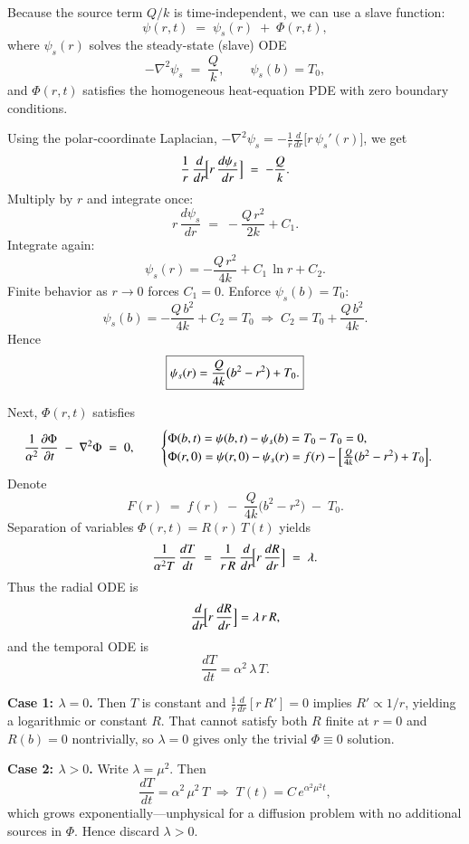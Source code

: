 \documentclass{report}
\begin{document}
Because the source term \(Q/k\) is time‐independent, we can use a slave function:
\[
\psi(r,t) \;=\; \psi_{s}(r) \;+\; \Phi(r,t),
\]
where \(\psi_{s}(r)\) solves the steady-state (slave) ODE
\[
-\nabla^{2}\psi_{s} \;=\; \frac{Q}{k}, 
\qquad \psi_{s}(b)=T_{0},
\]
and \(\Phi(r,t)\) satisfies the homogeneous heat‐equation PDE with zero boundary conditions.

Using the polar‐coordinate Laplacian, \(-\nabla^{2}\psi_{s} = -\frac{1}{r}\frac{d}{dr}\!\bigl[r\,\psi_{s}'(r)\bigr]\), we get
\[
\frac{1}{r}\,\frac{d}{dr}\!\Bigl[r\,\frac{d\psi_{s}}{dr}\Bigr] \;=\; -\frac{Q}{k}.
\]
Multiply by \(r\) and integrate once:
\[
r\,\frac{d\psi_{s}}{dr} \;=\; -\frac{Q\,r^{2}}{2k} + C_{1}.
\]
Integrate again:
\[
\psi_{s}(r) 
= -\frac{Q\,r^{2}}{4k} + C_{1}\,\ln r + C_{2}.
\]
Finite behavior as \(r\to0\) forces \(C_{1}=0\).  Enforce \(\psi_{s}(b)=T_{0}\):
\[
\psi_{s}(b) = -\frac{Q\,b^{2}}{4k} + C_{2} = T_{0} 
\;\Longrightarrow\; 
C_{2} = T_{0} + \frac{Q\,b^{2}}{4k}.
\]
Hence
\[
\boxed{%
\psi_{s}(r) 
= \frac{Q}{4k}\bigl(b^{2} - r^{2}\bigr) + T_{0}.
}
\]

Next, \(\Phi(r,t)\) satisfies
\[
\frac{1}{\alpha^{2}}\frac{\partial \Phi}{\partial t} \;-\;\nabla^{2}\Phi \;=\;0,
\qquad
\begin{cases}
\Phi(b,t) = \psi(b,t) - \psi_{s}(b) = T_{0} - T_{0} = 0,\\
\Phi(r,0) = \psi(r,0) - \psi_{s}(r) = f(r) - \Bigl[\tfrac{Q}{4k}(b^{2} - r^{2}) + T_{0}\Bigr].
\end{cases}
\]
Denote 
\[
F(r) \;=\; f(r) \;-\; \frac{Q}{4k}\bigl(b^{2} - r^{2}\bigr) \;-\; T_{0}.
\]
Separation of variables \(\Phi(r,t) = R(r)\,T(t)\) yields
\[
\frac{1}{\alpha^{2}T}\,\frac{dT}{dt} 
\;=\; 
\frac{1}{r\,R}\,\frac{d}{dr}\!\Bigl[r\,\frac{dR}{dr}\Bigr] 
\;=\;\lambda.
\]
Thus the radial ODE is
\[
\frac{d}{dr}\!\Bigl[r\,\frac{dR}{dr}\Bigr]
= \lambda\,r\,R,
\]
and the temporal ODE is
\[
\frac{dT}{dt} = \alpha^{2}\,\lambda\,T.
\]

\textbf{Case 1: \(\lambda = 0\).}  Then \(T\) is constant and \(\frac{1}{r}\frac{d}{dr}[r\,R'] = 0\) implies \(R' \propto 1/r\), yielding a logarithmic or constant \(R\).  That cannot satisfy both \(R\) finite at \(r=0\) and \(R(b)=0\) nontrivially, so \(\lambda=0\) gives only the trivial \(\Phi\equiv0\) solution.

\textbf{Case 2: \(\lambda > 0\).} Write \(\lambda = \mu^{2}\).  Then
\[
\frac{dT}{dt} = \alpha^{2}\,\mu^{2}\,T \;\Longrightarrow\; T(t) = C\,e^{\alpha^{2}\mu^{2}t},
\]
which grows exponentially—unphysical for a diffusion problem with no additional sources in \(\Phi\).  Hence discard \(\lambda>0\).
\end{document}
